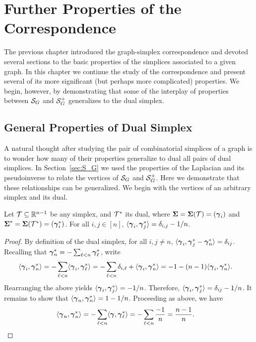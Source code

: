 \chapter{Further Properties of the Correspondence}
\label{chap:further_properties}


The previous chapter introduced the graph-simplex correspondence and devoted several sections to the basic properties of the simplices associated to a given graph. In this chapter we  continue the study of the correspondence and present several of its more significant (but perhaps more complicated) properties.  We begin,  however, by demonstrating that  some of the interplay of properties between $\mathcal{S}_G$ and $\mathcal{S}_G^+$ generalizes to the dual simplex. 

\section{General Properties of Dual Simplex }
A natural thought  after  studying the pair of combinatorial simplices of a graph  is  to  wonder  how many of their properties  generalize to dual all pairs of dual simplices. In Section~\ref{sec:S_G} we used the properties of the Laplacian and  its  pseudoinverse to relate  the vertices of $\mathcal{S}_G$ and $\mathcal{S}_G^+$. Here we demonstrate that these relationships can be generalized. We begin with the vertices of an arbitrary simplex  and its  dual. 


\begin{lemma}
	\label{lem:dot_dual_vertices}
	Let  $\mathcal{T}\subseteq\mathbb{R}^{n-1}$ be any simplex, and $\mathcal{T}^*$ its dual, where $\boldsymbol{\Sigma}=\boldsymbol{\Sigma}(\mathcal{T})=(\vb*{\gamma}_i)$ and $\boldsymbol{\Sigma}^*=\boldsymbol{\Sigma}(\mathcal{T}^*)=(\vb*{\gamma}^*_i)$. 
	For all $i,j\in[n]$, $\langle \vb*{\gamma}_i,\vb*{\gamma}_j^*\rangle=\delta_{i,j}-1/n$. 
\end{lemma}
\begin{proof}
	By definition of the dual simplex, for all $i,j\neq n$, $\langle \vb*{\gamma}_i,\vb*{\gamma}^*_j-\vb*{\gamma}^*_n\rangle = \delta_{ij}$. Recalling that $\vb*{\gamma}^*_n=-\sum_{\ell<n}\vb*{\gamma}^*_\ell$, write 
	\begin{align*}
	\langle \vb*{\gamma}_i,\vb*{\gamma}^*_n\rangle &= - \sum_{\ell<n}\langle \vb*{\gamma}_i,\vb*{\gamma}^*_\ell\rangle 
	= -\sum_{\ell<n} \delta_{i,\ell} + \langle \vb*{\gamma}_i,\vb*{\gamma}^*_n\rangle 
	= -1 - (n-1)\langle\vb*{\gamma}_i,\vb*{\gamma}^*_n\rangle.
	\end{align*}
	Rearranging the above yields $\langle \vb*{\gamma}_i,\vb*{\gamma}_j^*\rangle = -1/n$. Therefore, $\langle \vb*{\gamma}_i,\vb*{\gamma}^*_j\rangle = \delta_{ij} - 1/n$. It remains to show that $\langle\vb*{\gamma}_n,\vb*{\gamma}^*_n\rangle=1-1/n$. Proceeding as above, we have 
	\begin{align*}
	\langle\vb*{\gamma}_n,\vb*{\gamma}^*_n\rangle &= -\sum_{\ell<n}\langle \vb*{\gamma},\vb*{\gamma}^*_\ell\rangle = -\sum_{\ell<n} \frac{-1}{n} = \frac{n-1}{n}.\qedhere
	\end{align*}
\end{proof}

